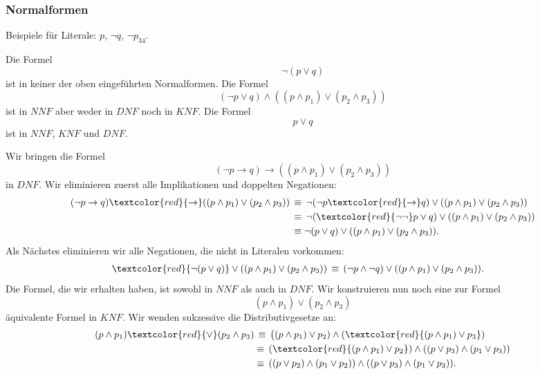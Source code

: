 \subsubsection{Normalformen}

\begin{example}
Beispiele für Literale: $p$, $\neg q$, $\neg p_{34}$.
\end{example}

\begin{example}
Die Formel
\[
\neg(p\lor q)
\]
ist in keiner der oben eingeführten Normalformen. Die Formel
\[
(\neg p\lor q)\land ((p\land p_1)\lor(p_2\land p_3))
\]
ist in $NNF$ aber weder in $DNF$ noch in $KNF$. Die Formel
\[
p\lor q
\]
ist in $NNF$, $KNF$ und $DNF$.
\end{example}

\begin{example}
Wir bringen die Formel
\[
(\neg p\to q)\to ((p\land p_1)\lor(p_2\land p_3))
\]
in $DNF$. 
\tcblower
Wir eliminieren zuerst alle Implikationen und doppelten Negationen:
\begin{align*}
(\neg p\to q)\textcolor{red}{\to} ((p\land p_1)\lor(p_2\land p_3))\,&\equiv\, \neg(\neg p\textcolor{red}{\to} q)\lor ((p\land p_1)\lor(p_2\land p_3))\\
&\equiv\, \neg(\textcolor{red}{\neg\neg} p \lor q)\lor ((p\land p_1)\lor(p_2\land p_3))\\
&\equiv \neg(p \lor q)\lor ((p\land p_1)\lor(p_2\land p_3)).
\end{align*}
Als Nächstes eliminieren wir alle Negationen, die nicht in Literalen vorkommen:
\begin{align*}
\textcolor{red}{\neg(p \lor q)}\lor ((p\land p_1)\lor(p_2\land p_3))\,&\equiv\,(\neg p\land\neg q)\lor ((p\land p_1)\lor(p_2\land p_3)).
\end{align*}
Die Formel, die wir erhalten haben, ist sowohl in $NNF$ als auch in $DNF$. Wir konstruieren nun noch eine zur Formel
\[
(p\land p_1)\lor(p_2\land p_3)
\]
äquivalente Formel in $KNF$. Wir wenden sukzessive die Distributivgesetze an:
\begin{align*}
(p\land p_1)\textcolor{red}{\lor}(p_2\land p_3)&\,\equiv\,\big( (p\land p_1)\lor p_2)\land (\textcolor{red}{(p\land p_1)\lor p_3})\\
&\equiv\, (\textcolor{red}{(p\land p_1)\lor p_2})\land ((p\lor p_3)\land(p_1\lor p_3))\\
&\equiv\, ((p\lor p_2)\land(p_1\lor p_2))\land ((p\lor p_3)\land(p_1\lor p_3)).
\end{align*}
\end{example}

